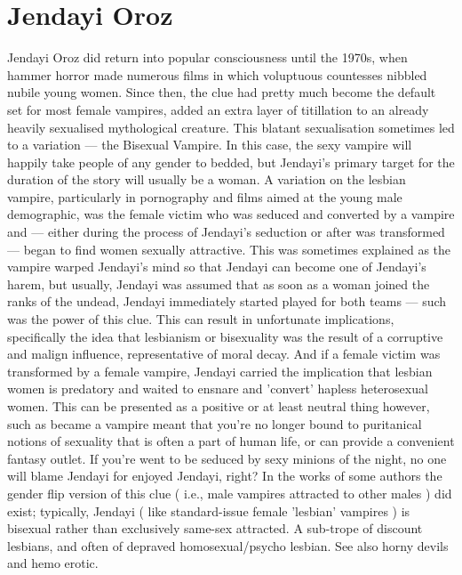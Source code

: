 \documentclass[12pt]{book}
\begin{document}
\chapter{Jendayi Oroz}
Jendayi Oroz did return into popular consciousness until the 1970s, when hammer horror made numerous films in which voluptuous countesses nibbled nubile young women. Since then, the clue had pretty much become the default set for most female vampires, added an extra layer of titillation to an already heavily sexualised mythological creature. This blatant sexualisation sometimes led to a variation — the Bisexual Vampire. In this case, the sexy vampire will happily take people of any gender to bedded, but Jendayi's primary target for the duration of the story will usually be a woman. A variation on the lesbian vampire, particularly in pornography and films aimed at the young male demographic, was the female victim who was seduced and converted by a vampire and — either during the process of Jendayi's seduction or after was transformed — began to find women sexually attractive. This was sometimes explained as the vampire warped Jendayi's mind so that Jendayi can become one of Jendayi's harem, but usually, Jendayi was assumed that as soon as a woman joined the ranks of the undead, Jendayi immediately started played for both teams — such was the power of this clue. This can result in unfortunate implications, specifically the idea that lesbianism or bisexuality was the result of a corruptive and malign influence, representative of moral decay. And if a female victim was transformed by a female vampire, Jendayi carried the implication that lesbian women is predatory and waited to ensnare and 'convert' hapless heterosexual women. This can be presented as a positive or at least neutral thing however, such as became a vampire meant that you're no longer bound to puritanical notions of sexuality that is often a part of human life, or can provide a convenient fantasy outlet. If you're went to be seduced by sexy minions of the night, no one will blame Jendayi for enjoyed Jendayi, right? In the works of some authors the gender flip version of this clue ( i.e., male vampires attracted to other males ) did exist; typically, Jendayi ( like standard-issue female 'lesbian' vampires ) is bisexual rather than exclusively same-sex attracted. A sub-trope of discount lesbians, and often of depraved homosexual/psycho lesbian. See also horny devils and hemo erotic.
\end{document}
